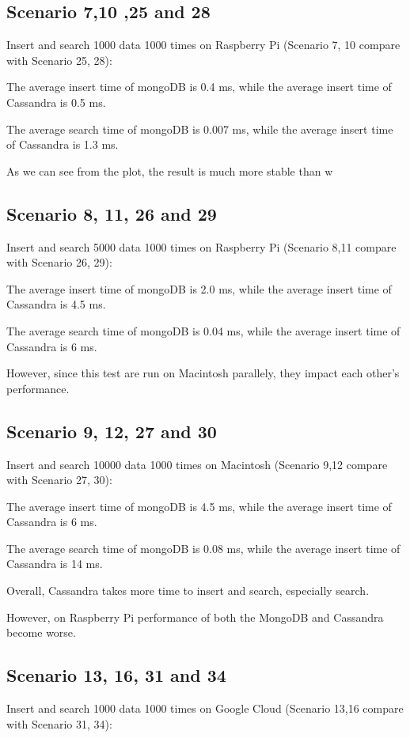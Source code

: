 \subsection{Scenario 7,10 ,25 and 28}
Insert and search 1000 data 1000 times on Raspberry Pi 
(Scenario 7, 10 compare with Scenario 25, 28):

The average insert time of mongoDB is 0.4 ms, while the average insert time of 
Cassandra is 0.5 ms.

The average search time of mongoDB is 0.007 ms, while the average 
insert time of 
Cassandra is 1.3 ms.

As we can see from the plot, the result is much more stable than w

\subsection{Scenario 8, 11, 26 and 29}
Insert and search 5000 data 1000 times on Raspberry Pi 
(Scenario 8,11 compare with Scenario 26, 29):

The average insert time of mongoDB is 2.0 ms, while the average insert time of 
Cassandra is 4.5 ms.

The average search time of mongoDB is 0.04 ms, while the average 
insert time of 
Cassandra is 6 ms.

However, since this test are run on Macintosh parallely, they impact each other's 
performance.

\subsection{Scenario 9, 12, 27 and 30}
Insert and search 10000 data 1000 times on Macintosh 
(Scenario 9,12 compare with Scenario 27, 30):

The average insert time of mongoDB is 4.5 ms, while the average insert time of 
Cassandra is 6 ms.

The average search time of mongoDB is 0.08 ms, while the average
 insert time of 
Cassandra is 14 ms.

Overall, Cassandra takes more time to insert and search, especially search. 

However, on Raspberry Pi performance of  both the MongoDB and Cassandra 
become worse.



\subsection{Scenario 13, 16, 31 and 34}
Insert and search 1000 data 1000 times on Google Cloud
(Scenario 13,16 compare with Scenario 31, 34):

